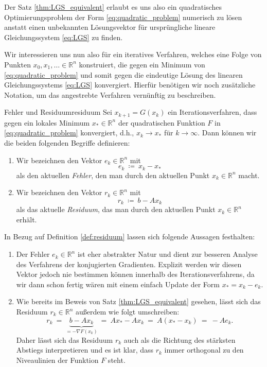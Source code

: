 Der Satz \ref{thm:LGS_equivalent} erlaubt es uns also ein quadratisches Optimierungsproblem der Form \eqref{eq:quadratic_problem} numerisch zu lösen anstatt einen unbekannten Lösungsvektor für ursprüngliche lineare Gleichungssystem \eqref{eq:LGS} zu finden.

Wir interessieren uns nun also für ein iteratives Verfahren, welches eine Folge von Punkten $x_0,x_1,\ldots \in \mathbb{R}^n$ konstruiert, die gegen ein Minimum von \eqref{eq:quadratic_problem} und somit gegen die eindeutige Lösung des linearen Gleichungssystems \eqref{eq:LGS} konvergiert.
Hierfür benötigen wir noch zusätzliche Notation, um das angestrebte Verfahren vernünftig zu beschreiben.
\begin{definition}{Fehler und Residuum}{residuum}
Sei $x_{k+1} = G(x_k)$ ein Iterationsverfahren, dass gegen ein lokales Minimum $x_* \in \mathbb{R}^n$ der quadratischen Funktion $F$ in \eqref{eq:quadratic_problem} konvergiert, d.h., $x_k \rightarrow x_*$ für $k \rightarrow \infty$. Dann können wir die beiden folgenden Begriffe definieren:
\begin{enumerate}[label=(\roman*)]
\item Wir bezeichnen den Vektor $e_k \in \mathbb{R}^n$ mit
\begin{equation*}
e_k \ \coloneqq \ x_k - x_*
\end{equation*}
als den aktuellen \emph{Fehler}, den man durch den aktuellen Punkt $x_k \in \mathbb{R}^n$ macht.
\item Wir bezeichnen den Vektor $r_k \in \mathbb{R}^n$ mit
\begin{equation*}
r_k \ \coloneqq \ b - Ax_k
\end{equation*}
als das aktuelle \emph{Residuum}, das man durch den aktuellen Punkt $x_k \in \mathbb{R}^n$ erhält. 
\end{enumerate}
\end{definition}
\begin{remark}{}{}
In Bezug auf Definition \ref{def:residuum} lassen sich folgende Aussagen festhalten:
\begin{enumerate}[label=(\roman*)]
\item Der Fehler $e_k \in \mathbb{R}^n$ ist eher abstrakter Natur und dient zur besseren Analyse des Verfahrens der konjugierten Gradienten. Explizit werden wir diesen Vektor jedoch nie bestimmen können innerhalb des Iterationsverfahrens, da wir dann schon fertig wären mit einem einfach Update der Form $x_* = x_k - e_k$.
\item Wie bereits im Beweis von Satz \ref{thm:LGS_equivalent} gesehen, lässt sich das Residuum $r_k \in \mathbb{R}^n$ außerdem wie folgt umschreiben:
\begin{equation*}
r_k \ = \ \underbrace{b - Ax_k}_{= -\nabla F(x_k)} \ = \ Ax_* - Ax_k \ = \ A (x_* - x_k) \ = \ -Ae_k.
\end{equation*}
Daher lässt sich das Residuum $r_k$ auch als die Richtung des stärksten Abstiegs interpretieren und es ist klar, dass $r_k$ immer orthogonal zu den Niveaulinien der Funktion $F$ steht.
\end{enumerate}
\end{remark}
